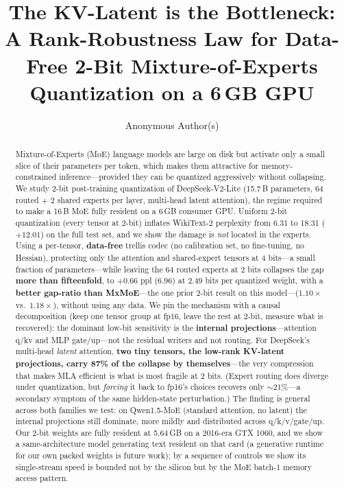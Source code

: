 \documentclass[10pt]{article}
\title{\textbf{The KV-Latent is the Bottleneck:\\
A Rank-Robustness Law for Data-Free 2-Bit Mixture-of-Experts Quantization on a 6\,GB GPU}}
\author{Anonymous Author(s)}
\affil{\textit{Affiliation withheld for review}}
\date{}
\begin{document}
\maketitle

\begin{abstract}
Mixture-of-Experts (MoE) language models are large on disk but activate only a small slice of their
parameters per token, which makes them attractive for memory-constrained inference---provided they can
be quantized aggressively without collapsing. We study 2-bit post-training quantization of
DeepSeek-V2-Lite (15.7\,B parameters, 64 routed $+$ 2 shared experts per layer, multi-head latent
attention), the regime required to make a 16\,B MoE fully resident on a 6\,GB consumer GPU. Uniform
2-bit quantization (every tensor at 2-bit) inflates WikiText-2 perplexity from 6.31 to 18.31 ($+12.01$) on the full test set, and we show the damage is
\emph{not} located in the experts. Using a per-tensor, \textbf{data-free} trellis codec (no calibration
set, no fine-tuning, no Hessian), protecting only the attention and shared-expert tensors at 4 bits---a
small fraction of parameters---while leaving the 64 routed experts at 2 bits collapses the gap
\textbf{more than fifteenfold}, to $+0.66$ ppl (6.96) at 2.49 bits per quantized weight, with a \textbf{better gap-ratio than MxMoE}---the
one prior 2-bit result on this model---($1.10\times$ vs.\ $1.18\times$), without using any data. We pin the mechanism
with a causal decomposition (keep one tensor group at fp16, leave the rest at 2-bit, measure what is
recovered): the dominant low-bit sensitivity is the \textbf{internal projections}---attention q/kv and
MLP gate/up---not the residual writers and not routing. For DeepSeek's multi-head \emph{latent}
attention, \textbf{two tiny tensors, the low-rank KV-latent projections, carry 87\% of the collapse by
themselves}---the very compression that makes MLA efficient is what is most fragile at 2 bits. (Expert
routing does diverge under quantization, but \emph{forcing} it back to fp16's choices recovers only
${\sim}21\%$---a secondary symptom of the same hidden-state perturbation.) The finding is
general across both families we test: on Qwen1.5-MoE (standard attention, no latent) the internal projections still
dominate, more mildly and distributed across q/k/v/gate/up. Our 2-bit weights are fully resident at
5.64\,GB on a 2016-era GTX 1060, and we show a same-architecture model generating text resident on that
card (a generative runtime for our own packed weights is future work); by a sequence of controls we show
its single-stream speed is bounded not by the silicon but by the MoE batch-1 memory access pattern.

\end{abstract}
\end{document}
